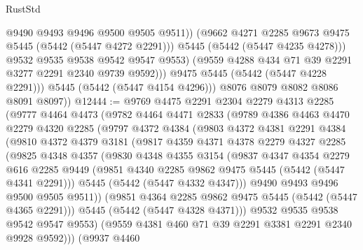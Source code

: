 \begin{lexlean}{RustStd}
\begin{coremodule}
                        @9490
                        @9493
                        @9496
                        @9500
                        @9505
                        @9511))
                    (@9662 @4271 @2285 @9673 @9475 @5445 (@5442 (@5447 @4272 @2291)))
                    @5445
                    (@5442 (@5447 @4235 @4278)))
                  @9532
                  @9535
                  @9538
                  @9542
                  @9547
                  @9553)
                (@9559 @4288 @434 @71 @39 @2291 @3277 @2291 @2340 @9739 @9592)))
            @9475
            @5445
            (@5442 (@5447 @4228 @2291)))
          @5445
          (@5442 (@5447 @4154 @4296)))
        @8076
        @8079
        @8082
        @8086
        @8091
        @8097))
@12444 := @9769
    @4475
    @2291
    @2304
    @2279
    @4313
    @2285
    (@9777
      @4464
      @4473
      (@9782
        @4464
        @4471
        @2833
        (@9789
          @4386
          @4463
          @4470
          @2279
          @4320
          @2285
          (@9797
            @4372
            @4384
            (@9803
              @4372
              @4381
              @2291
              @4384
              (@9810
                @4372
                @4379
                @3181
                (@9817
                  @4359
                  @4371
                  @4378
                  @2279
                  @4327
                  @2285
                  (@9825
                    @4348
                    @4357
                    (@9830
                      @4348
                      @4355
                      @3154
                      (@9837
                        @4347
                        @4354
                        @2279
                        @616
                        @2285
                        @9449
                        (@9851 @4340 @2285 @9862 @9475 @5445 (@5442 (@5447 @4341 @2291)))
                        @5445
                        (@5442 (@5447 @4332 @4347)))
                      @9490
                      @9493
                      @9496
                      @9500
                      @9505
                      @9511))
                  (@9851 @4364 @2285 @9862 @9475 @5445 (@5442 (@5447 @4365 @2291)))
                  @5445
                  (@5442 (@5447 @4328 @4371)))
                @9532
                @9535
                @9538
                @9542
                @9547
                @9553)
              (@9559 @4381 @460 @71 @39 @2291 @3381 @2291 @2340 @9928 @9592)))
          (@9937
            @4460

\end{coremodule}
\end{lexlean}
